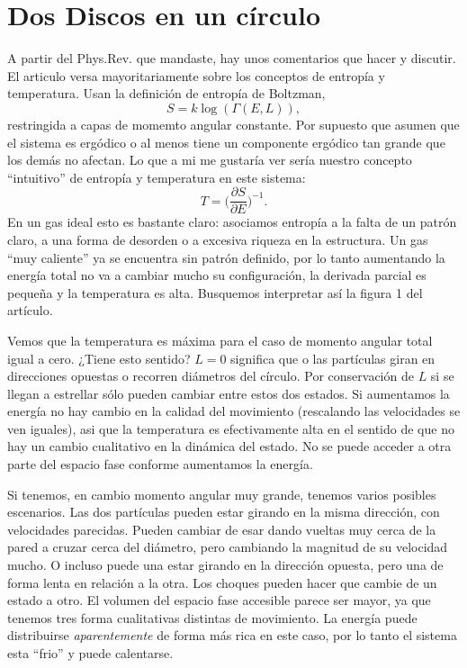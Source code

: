 \documentclass[letterpaper,10pt]{article}
\begin{document}
\section{Dos Discos en un círculo}

A partir del Phys.Rev. que mandaste, hay unos comentarios que hacer y
discutir. 
El articulo versa mayoritariamente sobre
 los conceptos de entropía y temperatura. 
Usan la definición de entropía de Boltzman,
\begin{equation}
  S=k \log (\Gamma(E,L) ),
\end{equation}
restringida a capas de momemto angular constante.
Por supuesto que asumen que el sistema es ergódico o al menos
tiene un componente ergódico tan grande que los demás no afectan. Lo
que a mi me gustaría ver sería nuestro concepto ``intuitivo''
de entropía y temperatura en este sistema:
\begin{equation}
T=\Big(\frac{\partial S}{\partial E} \Big)^{-1}.
\end{equation}
En un gas ideal esto es bastante claro: asociamos entropía a la falta
de un patrón claro, a una forma de desorden o a excesiva riqueza en la
estructura. Un gas ``muy caliente'' ya se encuentra sin patrón definido,
por lo tanto aumentando la energía total no va a cambiar mucho su
configuración, la derivada parcial es pequeña y la temperatura
es alta. Busquemos interpretar así la figura 1 del artículo.

Vemos que la temperatura es máxima para el caso de momento
angular total igual a cero. ¿Tiene esto sentido? 
$L=0$ significa que o las partículas giran
en direcciones opuestas o recorren diámetros del círculo. 
Por conservación de $L$ si se llegan a estrellar
sólo pueden cambiar entre estos dos estados. Si aumentamos la energía
no hay cambio en la calidad del movimiento (rescalando las velocidades
se ven iguales), asi que la temperatura es efectivamente alta en
el sentido de que no hay un cambio cualitativo en la dinámica
del estado. No se puede acceder a otra parte del espacio fase conforme
aumentamos la energía.

Si tenemos, en cambio momento angular muy grande, tenemos varios 
posibles escenarios. Las dos partículas pueden estar girando
en la misma dirección, con velocidades parecidas. Pueden
cambiar de esar dando vueltas muy cerca de la pared a cruzar cerca
del diámetro, pero cambiando la magnitud de su velocidad mucho. 
O incluso puede una estar girando en la dirección opuesta,
pero una de forma lenta en relación a la otra. Los choques pueden
hacer que cambie de un estado a otro. 
El volumen del espacio fase accesible parece ser mayor,
ya que tenemos tres forma cualitativas distintas de movimiento. 
La energía puede distribuirse \emph{aparentemente} de
forma más rica en este caso, por lo tanto el sistema esta
``frio'' y puede calentarse. 
\end{document}
